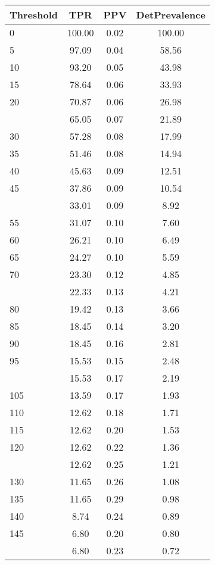 \begin{table}[ht]
\centering
\begin{tabular}{lccc}
  \toprule
Threshold & TPR & PPV & DetPrevalence \\ 
  \midrule
0 & 100.00 & 0.02 & 100.00 \\ 
  5 & 97.09 & 0.04 & 58.56 \\ 
  10 & 93.20 & 0.05 & 43.98 \\ 
  15 & 78.64 & 0.06 & 33.93 \\ 
  20 & 70.87 & 0.06 & 26.98 \\ 
   \addlinespace
25 & 65.05 & 0.07 & 21.89 \\ 
  30 & 57.28 & 0.08 & 17.99 \\ 
  35 & 51.46 & 0.08 & 14.94 \\ 
  40 & 45.63 & 0.09 & 12.51 \\ 
  45 & 37.86 & 0.09 & 10.54 \\ 
   \addlinespace
50 & 33.01 & 0.09 & 8.92 \\ 
  55 & 31.07 & 0.10 & 7.60 \\ 
  60 & 26.21 & 0.10 & 6.49 \\ 
  65 & 24.27 & 0.10 & 5.59 \\ 
  70 & 23.30 & 0.12 & 4.85 \\ 
   \addlinespace
75 & 22.33 & 0.13 & 4.21 \\ 
  80 & 19.42 & 0.13 & 3.66 \\ 
  85 & 18.45 & 0.14 & 3.20 \\ 
  90 & 18.45 & 0.16 & 2.81 \\ 
  95 & 15.53 & 0.15 & 2.48 \\ 
   \addlinespace
100 & 15.53 & 0.17 & 2.19 \\ 
  105 & 13.59 & 0.17 & 1.93 \\ 
  110 & 12.62 & 0.18 & 1.71 \\ 
  115 & 12.62 & 0.20 & 1.53 \\ 
  120 & 12.62 & 0.22 & 1.36 \\ 
   \addlinespace
125 & 12.62 & 0.25 & 1.21 \\ 
  130 & 11.65 & 0.26 & 1.08 \\ 
  135 & 11.65 & 0.29 & 0.98 \\ 
  140 & 8.74 & 0.24 & 0.89 \\ 
  145 & 6.80 & 0.20 & 0.80 \\ 
   \addlinespace
150 & 6.80 & 0.23 & 0.72 \\ 

\end{tabular}
\end{table}
